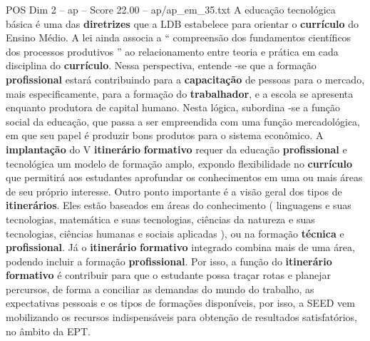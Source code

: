 \begin{textsample}{POS Dim 2 – ap – Score 22.00 – ap/ap\_em\_35.txt}
A educação tecnológica básica é uma das \textbf{diretrizes} que a LDB estabelece para orientar o \textbf{currículo} do Ensino Médio.
A lei ainda associa a “ compreensão dos fundamentos científicos dos processos produtivos ” ao relacionamento entre teoria e prática em cada disciplina do \textbf{currículo}.
Nessa perspectiva, entende -se que a formação \textbf{profissional} estará contribuindo para a \textbf{capacitação} de pessoas para o mercado, mais especificamente, para a formação do \textbf{trabalhador}, e a escola se apresenta enquanto produtora de capital humano.
Nesta lógica, subordina -se a função social da educação, que passa a ser empreendida com uma função mercadológica, em que seu papel é produzir bons produtos para o sistema econômico.
A \textbf{implantação} do V \textbf{itinerário} \textbf{formativo} requer da educação \textbf{profissional} e tecnológica um modelo de formação amplo, expondo flexibilidade no \textbf{currículo} que permitirá aos estudantes aprofundar os conhecimentos em uma ou mais áreas de seu próprio interesse.
Outro ponto importante é a visão geral dos tipos de \textbf{itinerários}.
Eles estão baseados em áreas do conhecimento ( linguagens e suas tecnologias, matemática e suas tecnologias, ciências da natureza e suas tecnologias, ciências humanas e sociais aplicadas ), ou na formação \textbf{técnica} e \textbf{profissional}.
Já o \textbf{itinerário} \textbf{formativo} integrado combina mais de uma área, podendo incluir a formação \textbf{profissional}.
Por isso, a função do \textbf{itinerário} \textbf{formativo} é contribuir para que o estudante possa traçar rotas e planejar percursos, de forma a conciliar as demandas do mundo do trabalho, as expectativas pessoais e os tipos de formações disponíveis, por isso, a SEED vem mobilizando os recursos indispensáveis para obtenção de resultados satisfatórios, no âmbito da EPT.

\end{textsample}
